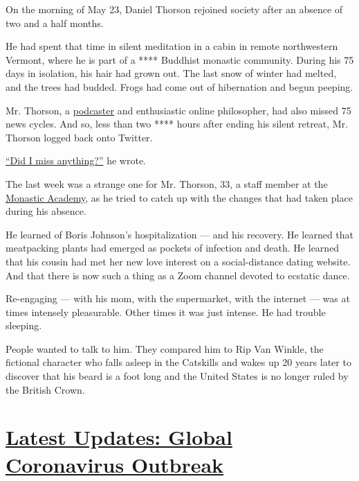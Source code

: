 On the morning of May 23, Daniel Thorson rejoined society after an
absence of two and a half months.

He had spent that time in silent meditation in a cabin in remote
northwestern Vermont, where he is part of a **** Buddhist monastic
community. During his 75 days in isolation, his hair had grown out. The
last snow of winter had melted, and the trees had budded. Frogs had come
out of hibernation and begun peeping.

Mr. Thorson, a
\href{https://podcasts.apple.com/us/podcast/emerge-making-sense-of-whats-next/id1057220344}{podcaster}
and enthusiastic online philosopher, had also missed 75 news cycles. And
so, less than two **** hours after ending his silent retreat, Mr.
Thorson logged back onto Twitter.

\href{https://twitter.com/dthorson/status/1264231987025457157}{``Did I
miss anything?''} he wrote.

The last week was a strange one for Mr. Thorson, 33, a staff member at
the \href{https://www.monasticacademy.com/}{Monastic Academy}, as he
tried to catch up with the changes that had taken place during his
absence.

He learned of Boris Johnson's hospitalization --- and his recovery. He
learned that meatpacking plants had emerged as pockets of infection and
death. He learned that his cousin had met her new love interest on a
social-distance dating website. And that there is now such a thing as a
Zoom channel devoted to ecstatic dance.

Re-engaging --- with his mom, with the supermarket, with the internet
--- was at times intensely pleasurable. Other times it was just intense.
He had trouble sleeping.

People wanted to talk to him. They compared him to Rip Van Winkle, the
fictional character who falls asleep in the Catskills and wakes up 20
years later to discover that his beard is a foot long and the United
States is no longer ruled by the British Crown.

\hypertarget{latest-updates-global-coronavirus-outbreak}{%
\section{\texorpdfstring{\href{https://www.nytimes.com/2020/08/01/world/coronavirus-covid-19.html?action=click\&pgtype=Article\&state=default\&region=MAIN_CONTENT_1\&context=storylines_live_updates}{Latest
Updates: Global Coronavirus
Outbreak}}{Latest Updates: Global Coronavirus Outbreak}}\label{latest-updates-global-coronavirus-outbreak}}

